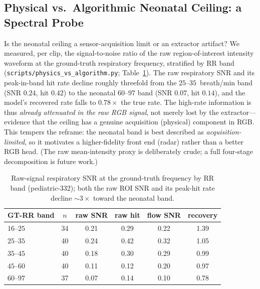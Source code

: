 \subsection{Physical vs.\ Algorithmic Neonatal Ceiling: a Spectral Probe}
Is the neonatal ceiling a sensor-acquisition limit or an extractor artifact? We measured, per clip, the
signal-to-noise ratio of the raw region-of-interest intensity waveform at the ground-truth respiratory
frequency, stratified by RR band (\texttt{scripts/physics\_vs\_algorithm.py}; Table~\ref{tab:physics}). The
raw respiratory SNR and its peak-in-band hit rate decline roughly threefold from the $25$--$35$~breath/min
band (SNR $0.24$, hit $0.42$) to the neonatal $60$--$97$ band (SNR $0.07$, hit $0.14$), and the model's
recovered rate falls to $0.78\times$ the true rate. The high-rate information is thus \emph{already
attenuated in the raw RGB signal}, not merely lost by the extractor---evidence that the ceiling has a
genuine acquisition (physical) component in RGB. This tempers the reframe: the neonatal band is best
described as \emph{acquisition-limited}, so it motivates a higher-fidelity front end (radar) rather than a
better RGB head. (The raw mean-intensity proxy is deliberately crude; a full four-stage decomposition is
future work.)

\begin{table}[!t]\centering\small
\caption{Raw-signal respiratory SNR at the ground-truth frequency by RR band (pediatric-332); both the raw
ROI SNR and its peak-hit rate decline $\sim$$3\times$ toward the neonatal band.}
\label{tab:physics}
\setlength{\tabcolsep}{4pt}
\begin{tabular}{@{}lccccc@{}}\toprule
GT-RR band & $n$ & raw SNR & raw hit & flow SNR & recovery\\\midrule
$16$--$25$ & 34 & 0.21 & 0.29 & 0.22 & 1.39\\
$25$--$35$ & 40 & 0.24 & 0.42 & 0.32 & 1.05\\
$35$--$45$ & 40 & 0.18 & 0.30 & 0.29 & 0.99\\
$45$--$60$ & 40 & 0.11 & 0.12 & 0.20 & 0.97\\
$60$--$97$ & 37 & 0.07 & 0.14 & 0.10 & 0.78\\\bottomrule
\end{tabular}
\end{table}

